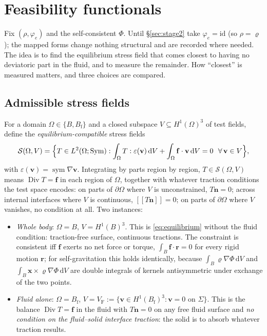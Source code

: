 \documentclass[11pt]{article}
\newcommand{\eps}{\varepsilon}
\newcommand{\Bf}{B_{\mathrm{f}}}
\newcommand{\bv}{\mathbf{v}}
\newcommand{\bx}{\mathbf{x}}
\newcommand{\bn}{\mathbf{n}}
\newcommand{\bff}{\mathbf{f}}
\newcommand{\br}{\mathbf{r}}
\newcommand{\jump}[1]{[\![#1]\!]}
\newcommand{\dV}{\,\mathrm{d}V}
\newcommand{\sym}{\operatorname{sym}}
\newcommand{\Div}{\operatorname{Div}}
\begin{document}
\section{Feasibility functionals}
\label{sec:functional}

Fix $(\rho, \varphi_e)$ and the self-consistent $\Phi$. Until
\S\ref{sec:stage2} take $\varphi_e = \mathrm{id}$ (so $\rho = \varrho$);
the mapped forms change nothing structural and are recorded where
needed. The idea is to find the equilibrium stress field that comes
closest to having no deviatoric part in the fluid, and to measure the
remainder. How ``closest'' is measured matters, and three choices are
compared.

\subsection{Admissible stress fields}

For a domain $\Omega \in \{B, \Bf\}$ and a closed subspace
$V \subseteq H^{1}(\Omega)^{3}$ of test fields, define the
\emph{equilibrium-compatible} stress fields
\begin{equation}
  \mathcal{S}(\Omega, V) = \Bigl\{ T \in L^{2}(\Omega; \mathrm{Sym}) :
  \int_{\Omega} T : \eps(\bv)\dV + \int_{\Omega} \bff\cdot\bv\dV = 0
  \ \ \forall\, \bv \in V \Bigr\},
  \label{eq:admissible}
\end{equation}
with $\eps(\bv) = \sym\nabla\bv$. Integrating by parts region by region,
$T \in \mathcal{S}(\Omega, V)$ means $\Div T = \bff$ in each region of
$\Omega$, together with whatever traction conditions the test space
encodes: on parts of $\partial\Omega$ where $V$ is unconstrained,
$T\bn = 0$; across internal interfaces where $V$ is continuous,
$\jump{T\bn} = 0$; on parts of $\partial\Omega$ where $V$ vanishes, no
condition at all. Two instances:
\begin{itemize}
\item \emph{Whole body}: $\Omega = B$, $V = H^{1}(B)^{3}$. This is
  \eqref{eq:equilibrium} without the fluid condition: traction-free
  surface, continuous tractions. The constraint is consistent iff $\bff$
  exerts no net force or torque, $\int_B \bff\cdot\br = 0$ for every
  rigid motion $\br$; for self-gravitation this holds identically,
  because $\int_B \varrho\nabla\Phi\dV$ and $\int_B
  \bx\times\varrho\nabla\Phi\dV$ are double integrals of kernels
  antisymmetric under exchange of the two points.
\item \emph{Fluid alone}: $\Omega = \Bf$, $V = V_{\mathrm{F}} :=
  \{\bv \in H^{1}(\Bf)^{3} : \bv = 0 \text{ on } \Sigma\}$. This is the
  balance $\Div T = \bff$ in the fluid with $T\bn = 0$ on any free fluid
  surface and \emph{no condition on the fluid--solid interface traction}:
  the solid is to absorb whatever traction results.
\end{itemize}
\end{document}
